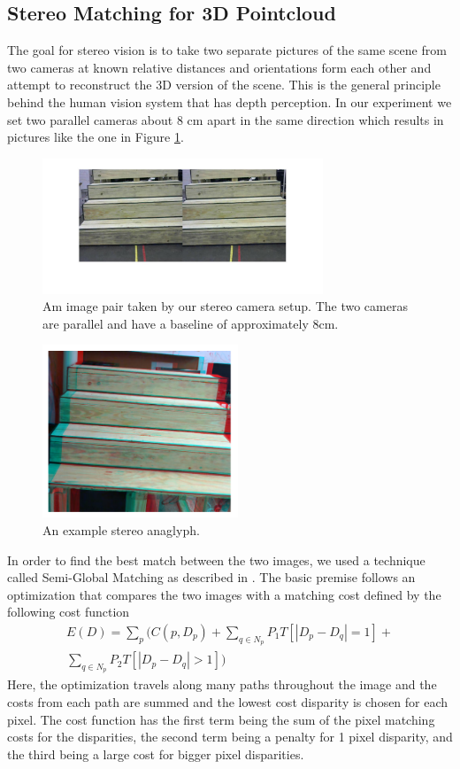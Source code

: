 \subsection{Stereo Matching for 3D Pointcloud} \label{stereo-matching-section}
The goal for stereo vision is to take two separate pictures of the same scene from two cameras at known relative distances and orientations form each other and attempt to reconstruct the 3D version of the scene. This is the general principle behind the human vision system that has depth perception. In our experiment we set two parallel cameras about 8 cm apart in the same direction which results in pictures like the one in Figure \ref{stereo-image-pair}.
\begin{figure}[!h]
\centering
\includegraphics[width=3.3in]{Sections/Figures/example_stereo_pair.jpg}
\caption{Am image pair taken by our stereo camera setup. The two cameras are parallel and have a baseline of approximately 8cm.}
\label{stereo-image-pair}
\end{figure}

\begin{figure}[!h]
\centering
\includegraphics[width=2.3in]{Sections/Figures/stereo_anaglyph.png}
\caption{An example stereo anaglyph.}
\label{stereo-anaglyph}
\end{figure}

In order to find the best match between the two images, we used a technique called Semi-Global Matching as described in \cite{1467526}. The basic premise follows an optimization that compares the two images with a matching cost defined by the following cost function
\begin{align*}
E(D) = \sum\limits_p(C(p,D_p)+\sum\limits_{q\in N_p}P_1T[|D_p-D_q|=1]+\\\sum\limits_{q\in N_p}P_2T[|D_p-D_q|>1])
\end{align*}
Here, the optimization travels along many paths throughout the image and the costs from each path are summed and the lowest cost disparity is chosen for each pixel. The cost function has the first term being the sum of the pixel matching costs for the disparities, the second term being a penalty for 1 pixel disparity, and the third being a large cost for bigger pixel disparities.

